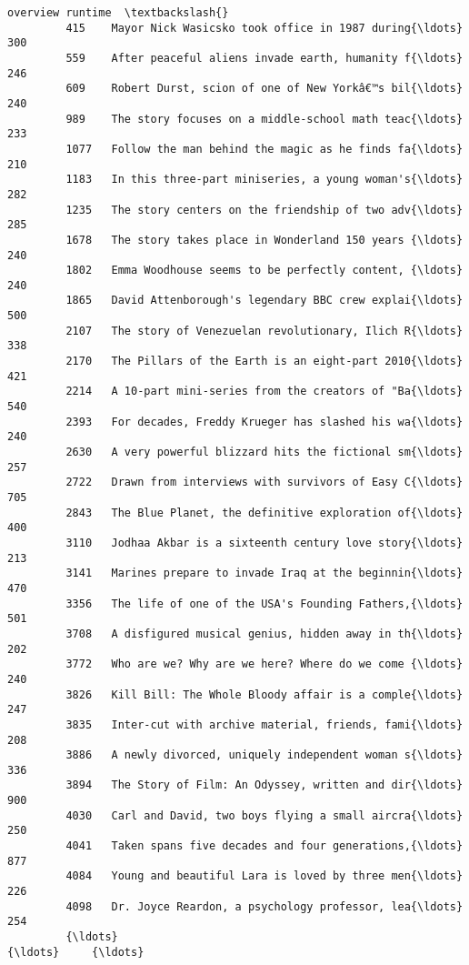 \documentclass[11pt]{article}
\begin{document}
\begin{Verbatim}[commandchars=\\\{\}]
                                                         overview runtime  \textbackslash{}
         415    Mayor Nick Wasicsko took office in 1987 during{\ldots}     300   
         559    After peaceful aliens invade earth, humanity f{\ldots}     246   
         609    Robert Durst, scion of one of New Yorkâ€™s bil{\ldots}     240   
         989    The story focuses on a middle-school math teac{\ldots}     233   
         1077   Follow the man behind the magic as he finds fa{\ldots}     210   
         1183   In this three-part miniseries, a young woman's{\ldots}     282   
         1235   The story centers on the friendship of two adv{\ldots}     285   
         1678   The story takes place in Wonderland 150 years {\ldots}     240   
         1802   Emma Woodhouse seems to be perfectly content, {\ldots}     240   
         1865   David Attenborough's legendary BBC crew explai{\ldots}     500   
         2107   The story of Venezuelan revolutionary, Ilich R{\ldots}     338   
         2170   The Pillars of the Earth is an eight-part 2010{\ldots}     421   
         2214   A 10-part mini-series from the creators of "Ba{\ldots}     540   
         2393   For decades, Freddy Krueger has slashed his wa{\ldots}     240   
         2630   A very powerful blizzard hits the fictional sm{\ldots}     257   
         2722   Drawn from interviews with survivors of Easy C{\ldots}     705   
         2843   The Blue Planet, the definitive exploration of{\ldots}     400   
         3110   Jodhaa Akbar is a sixteenth century love story{\ldots}     213   
         3141   Marines prepare to invade Iraq at the beginnin{\ldots}     470   
         3356   The life of one of the USA's Founding Fathers,{\ldots}     501   
         3708   A disfigured musical genius, hidden away in th{\ldots}     202   
         3772   Who are we? Why are we here? Where do we come {\ldots}     240   
         3826   Kill Bill: The Whole Bloody affair is a comple{\ldots}     247   
         3835   Inter-cut with archive material, friends, fami{\ldots}     208   
         3886   A newly divorced, uniquely independent woman s{\ldots}     336   
         3894   The Story of Film: An Odyssey, written and dir{\ldots}     900   
         4030   Carl and David, two boys flying a small aircra{\ldots}     250   
         4041   Taken spans five decades and four generations,{\ldots}     877   
         4084   Young and beautiful Lara is loved by three men{\ldots}     226   
         4098   Dr. Joyce Reardon, a psychology professor, lea{\ldots}     254   
         {\ldots}                                                  {\ldots}     {\ldots}   

\end{Verbatim}
\end{document}
